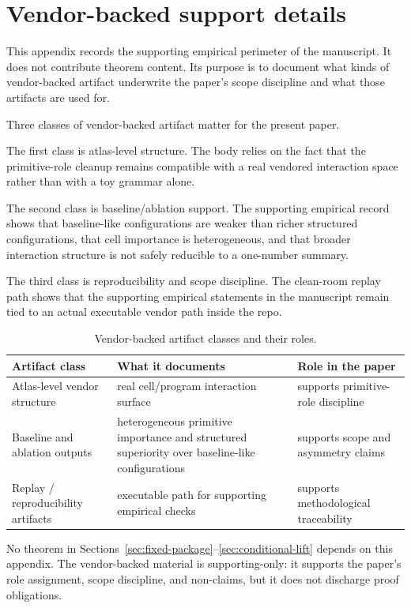 \section{Vendor-backed support details}\label{app:vendor-support-details}

This appendix records the supporting empirical perimeter of the manuscript. It does not contribute theorem content. Its purpose is to document what kinds of vendor-backed artifact underwrite the paper's scope discipline and what those artifacts are used for.

Three classes of vendor-backed artifact matter for the present paper.

The first class is atlas-level structure. The body relies on the fact that the primitive-role cleanup remains compatible with a real vendored interaction space rather than with a toy grammar alone.

The second class is baseline/ablation support. The supporting empirical record shows that baseline-like configurations are weaker than richer structured configurations, that cell importance is heterogeneous, and that broader interaction structure is not safely reducible to a one-number summary.

The third class is reproducibility and scope discipline. The clean-room replay path shows that the supporting empirical statements in the manuscript remain tied to an actual executable vendor path inside the repo.

\begin{table}[h]
\caption{Vendor-backed artifact classes and their roles.}
\label{tab:vendor-artifacts}
\centering
\small
\begin{tabularx}{\textwidth}{@{}l X X@{}}
\toprule
Artifact class & What it documents & Role in the paper \\
\midrule
Atlas-level vendor structure & real cell/program interaction surface & supports primitive-role discipline \\[4pt]
Baseline and ablation outputs & heterogeneous primitive importance and structured superiority over baseline-like configurations & supports scope and asymmetry claims \\[4pt]
Replay / reproducibility artifacts & executable path for supporting empirical checks & supports methodological traceability \\
\bottomrule
\end{tabularx}
\end{table}

No theorem in Sections~\ref{sec:fixed-package}--\ref{sec:conditional-lift} depends on this appendix. The vendor-backed material is supporting-only: it supports the paper's role assignment, scope discipline, and non-claims, but it does not discharge proof obligations.

